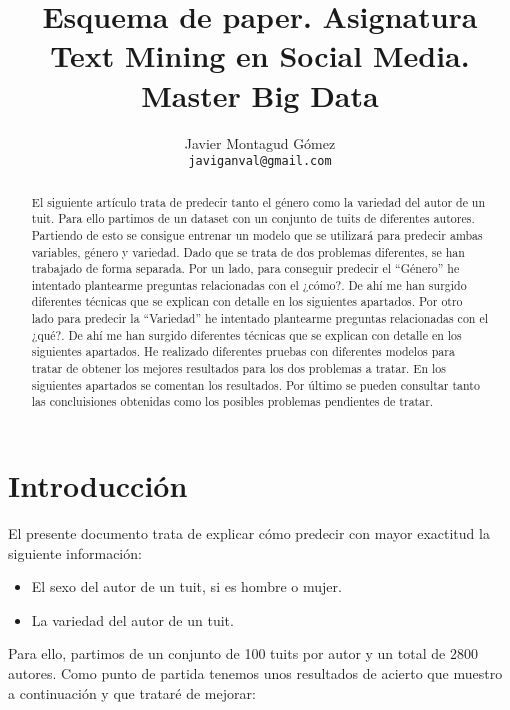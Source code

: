 \documentclass[11pt,a4paper]{article}
\title{Esquema de paper. Asignatura Text Mining en Social Media. Master Big Data}
\author{Javier Montagud G\'omez \\
  {\tt javiganval@gmail.com} \\}
\date{}
\begin{document}
\maketitle

\begin{abstract}
El siguiente art\'iculo trata de predecir tanto el g\'enero como la variedad del autor de un tuit.\newline
Para ello partimos de un dataset con un conjunto de tuits de diferentes autores. Partiendo de esto se consigue entrenar un modelo que se utilizar\'a para predecir ambas variables, género y variedad.\newline
Dado que se trata de dos problemas diferentes, se han trabajado de forma separada.\newline
Por un lado, para conseguir predecir el “G\'enero” he intentado plantearme preguntas relacionadas con el ¿c\'omo?. De ah\'i me han surgido diferentes t\'ecnicas que se explican con detalle en los siguientes apartados.\newline
Por otro lado para predecir la “Variedad” he intentado plantearme preguntas relacionadas con el ¿qu\'e?. De ah\'i me han surgido diferentes t\'ecnicas que se explican con detalle en los siguientes apartados.\newline
He realizado diferentes pruebas con diferentes modelos para tratar de obtener los mejores resultados para los dos problemas a tratar. En los siguientes apartados se comentan los resultados.\newline
Por \'ultimo se pueden consultar tanto las concluisiones obtenidas como los posibles problemas pendientes de tratar.

\end{abstract}

\section{Introducci\'on}


El presente documento trata de explicar c\'omo predecir con mayor exactitud la siguiente informaci\'on:

\begin{itemize}
 \item El sexo del autor de un tuit, si es hombre o mujer.
 \item La variedad del autor de un tuit.
\end{itemize}

Para ello, partimos de un conjunto de 100 tuits por autor y un total de 2800 autores.
Como punto de partida tenemos unos resultados de acierto que muestro a continuaci\'on y que tratar\'e de mejorar:
\end{document}
